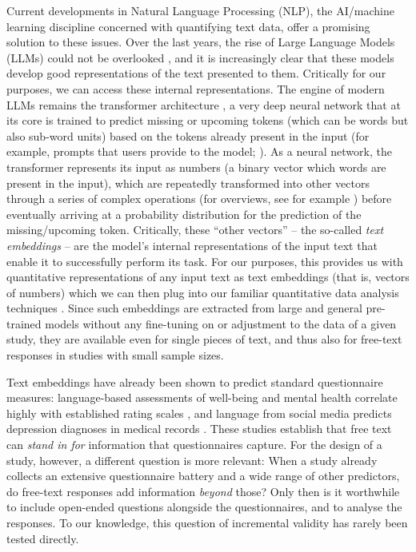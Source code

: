 \documentclass[man,floatsintext]{apa7}
\newcommand{\change}[1]{#1}
\begin{document}
Current developments in Natural Language Processing (NLP), the AI/machine learning discipline concerned with quantifying text data, offer a promising solution to these issues. Over the last years, the rise of Large Language Models (LLMs) could not be overlooked \parencite{brown2020language,demszky2023using}, and it \change{is increasingly clear} that these models develop good representations of the text presented to them. Critically for our purposes, we can access these internal representations. The engine of modern LLMs remains the transformer architecture \parencite{Vaswani2017}, a very deep neural network that at its core is trained to predict missing or upcoming tokens (which can be words but also sub-word units) based on the  tokens already present in the input (for example, prompts that users provide to the model; \cite{Devlin:2019,brown2020language}). As a neural network, the transformer represents its input as numbers (a binary vector which words are present in the input), which are repeatedly transformed into other vectors through a series of complex operations (for overviews, see for example \cite{Cassani2023,gunther2026large}) before eventually arriving at a probability distribution for the prediction of the missing/upcoming token. Critically, these ``other vectors'' -- the so-called \emph{text embeddings} -- are the model's internal representations of the input text that enable it to successfully perform its task. For our purposes, this provides us with quantitative representations of any input text as text embeddings (that is, vectors of numbers) which we can then plug into our familiar quantitative data analysis techniques \parencite{debelak2025embeddings,Kjell2019,kjell2023text}. \change{Since such embeddings are extracted from large and general pre-trained models without any fine-tuning on or adjustment to the data of a given study, they are available even for single pieces of text, and thus also for free-text responses in studies with small sample sizes.}

\change{Text embeddings have already been shown to predict standard questionnaire measures: language-based assessments of well-being and mental health correlate highly with established rating scales \parencite{Kjell2019,kjell2022natural}, and language from social media predicts depression diagnoses in medical records \parencite{eichstaedt2018facebook}. These studies establish that free text can \emph{stand in for} information that questionnaires capture. For the design of a study, however, a different question is more relevant: When a study already collects an extensive questionnaire battery and a wide range of other predictors, do free-text responses add information \emph{beyond} those? Only then is it worthwhile to include open-ended questions alongside the questionnaires, and to analyse the responses. To our knowledge, this question of incremental validity \parencite{hunsley2003incremental} has rarely been tested directly.}
\end{document}
